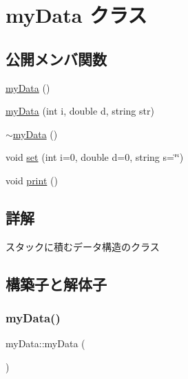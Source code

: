 \hypertarget{classmy_data}{}\section{my\+Data クラス}
\label{classmy_data}
\subsection*{公開メンバ関数}
\begin{DoxyCompactItemize}
\item 
\hyperlink{classmy_data_a2caf3cf4ad409a023510478883cf1f44}{my\+Data} ()
\item 
\hyperlink{classmy_data_ad8af4e53c33a9c39c1a04eca3c5809d3}{my\+Data} (int i, double d, string str)
\item 
\hyperlink{classmy_data_a89a5048237ec5c6d99312762123e7373}{$\sim$my\+Data} ()
\item 
void \hyperlink{classmy_data_a3b0cc7aa7c618b11cf63ef94e66f4860}{set} (int i=0, double d=0, string s=\char`\"{}\char`\"{})
\item 
void \hyperlink{classmy_data_a7a0ed4bbdb3e43467ad2e5e1f937ef6e}{print} ()
\end{DoxyCompactItemize}


\subsection{詳解}
スタックに積むデータ構造のクラス 

\subsection{構築子と解体子}
\mbox{\label{classmy_data_a2caf3cf4ad409a023510478883cf1f44}} 
\subsubsection{\texorpdfstring{my\+Data()}{myData()}\hspace{0.1cm}{\footnotesize\ttfamily [1/2]}}
{\footnotesize\ttfamily my\+Data\+::my\+Data (\begin{DoxyParamCaption}{ }\end{DoxyParamCaption})\hspace{0.3cm}{\ttfamily [inline]}}

\mbox{\label{classmy_data_ad8af4e53c33a9c39c1a04eca3c5809d3}} 
